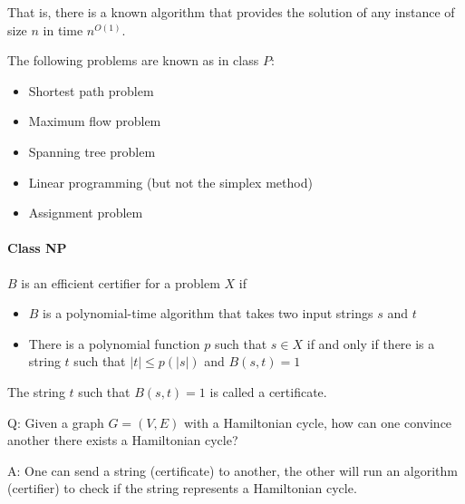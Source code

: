                     That is, there is a known algorithm that provides the solution of any instance of size $n$ in time $n^{O(1)}$.

                    \begin{example} The following problems are known as in class $P$:
                        \begin{itemize}
                            \item Shortest path problem
                            \item Maximum flow problem
                            \item Spanning tree problem
                            \item Linear programming (but not the simplex method)
                            \item Assignment problem
                        \end{itemize}
                    \end{example}

                \paragraph{Class NP}
                    \begin{definition}
                        $B$ is an efficient certifier for a problem $X$ if
                        \begin{itemize}
                            \item $B$ is a polynomial-time algorithm that takes two input strings $s$ and $t$
                            \item There is a polynomial function $p$ such that $s \in X$ if and only if there is a string $t$ such that $|t| \le p(|s|)$ and $B(s, t) = 1$
                        \end{itemize}
                        The string $t$ such that $B(s, t) = 1$ is called a certificate.
                    \end{definition}

                    \begin{example}
                        Q: Given a graph $G = (V, E)$ with a Hamiltonian cycle, how can one convince another there exists a Hamiltonian cycle? 

                        A: One can send a string (certificate) to another, the other will run an algorithm (certifier) to check if the string represents a Hamiltonian cycle.
                    \end{example}

